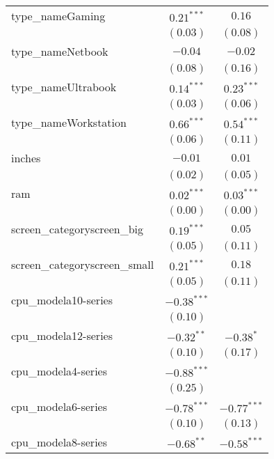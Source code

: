 \documentclass[
]{article}
\begin{document}
\begin{table}
\begin{center}
\begin{tabular}{l c c}
type\_nameGaming              & $0.21^{***}$  & $0.16$        \\
                              & $(0.03)$      & $(0.08)$      \\
type\_nameNetbook             & $-0.04$       & $-0.02$       \\
                              & $(0.08)$      & $(0.16)$      \\
type\_nameUltrabook           & $0.14^{***}$  & $0.23^{***}$  \\
                              & $(0.03)$      & $(0.06)$      \\
type\_nameWorkstation         & $0.66^{***}$  & $0.54^{***}$  \\
                              & $(0.06)$      & $(0.11)$      \\
inches                        & $-0.01$       & $0.01$        \\
                              & $(0.02)$      & $(0.05)$      \\
ram                           & $0.02^{***}$  & $0.03^{***}$  \\
                              & $(0.00)$      & $(0.00)$      \\
screen\_categoryscreen\_big   & $0.19^{***}$  & $0.05$        \\
                              & $(0.05)$      & $(0.11)$      \\
screen\_categoryscreen\_small & $0.21^{***}$  & $0.18$        \\
                              & $(0.05)$      & $(0.11)$      \\
cpu\_modela10-series          & $-0.38^{***}$ &               \\
                              & $(0.10)$      &               \\
cpu\_modela12-series          & $-0.32^{**}$  & $-0.38^{*}$   \\
                              & $(0.10)$      & $(0.17)$      \\
cpu\_modela4-series           & $-0.88^{***}$ &               \\
                              & $(0.25)$      &               \\
cpu\_modela6-series           & $-0.78^{***}$ & $-0.77^{***}$ \\
                              & $(0.10)$      & $(0.13)$      \\
cpu\_modela8-series           & $-0.68^{**}$  & $-0.58^{***}$ \\

\end{tabular}
\end{center}
\end{table}
\end{document}

